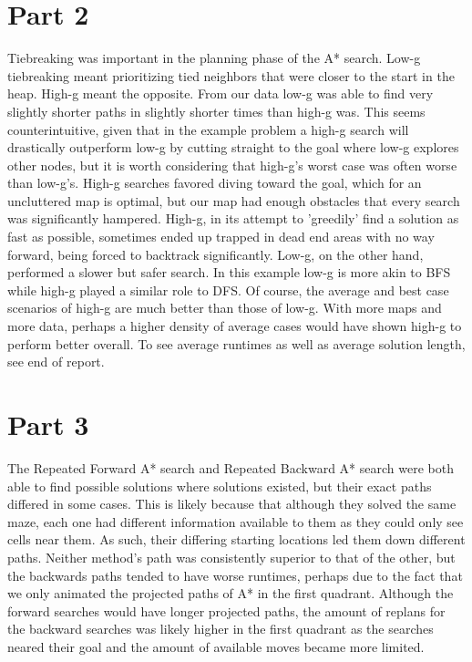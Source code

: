 \documentclass[a4paper,12pt]{article}
\begin{document}
\section{Part 2}
Tiebreaking was important in the planning phase of the A* search. Low-g tiebreaking meant prioritizing tied neighbors that were closer to the start in the heap. High-g meant the opposite. From our data low-g was able to find very slightly shorter paths in slightly shorter times than high-g was. This seems counterintuitive, given that in the example problem a high-g search will drastically outperform low-g by cutting straight to the goal where low-g explores other nodes, but it is worth considering that high-g's worst case was often worse than low-g's. High-g searches favored diving toward the goal, which for an uncluttered map is optimal, but our map had enough obstacles that every search was significantly hampered. High-g, in its attempt to 'greedily' find a solution as fast as possible, sometimes ended up trapped in dead end areas with no way forward, being forced to backtrack significantly. Low-g, on the other hand, performed a slower but safer search. In this example low-g is more akin to BFS while high-g played a similar role to DFS. Of course, the average and best case scenarios of high-g are much better than those of low-g. With more maps and more data, perhaps a higher density of average cases would have shown high-g to perform better overall. \newline
To see average runtimes as well as average solution length, see end of report.
\section{Part 3}
The Repeated Forward A* search and Repeated Backward A* search were both able to find possible solutions where solutions existed, but their exact paths differed in some cases. This is likely because that although they solved the same maze, each one had different information available to them as they could only see cells near them. As such, their differing starting locations led them down different paths. Neither method’s path was consistently superior to that of the other, but the backwards paths tended to have worse runtimes, perhaps due to the fact that we only animated the projected paths of A* in the first quadrant. Although the forward searches would have longer projected paths, the amount of replans for the backward searches was likely higher in the first quadrant as the searches neared their goal and the amount of available moves became more limited.
\end{document}
